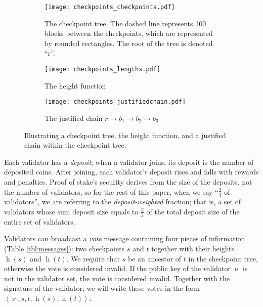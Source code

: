 \documentclass[12pt]{article}
\newcommand{\h}{\operatorname{h}\xspace}
\begin{document}
\begin{figure}[htb]
\centering
   \begin{subfigure}[b]{0.90\textwidth}
   \centering
   \texttt{[image: checkpoints\_checkpoints.pdf]}
	\caption{The checkpoint tree.  The dashed line represents 100 blocks between the checkpoints, which are represented by rounded rectangles.  The root of the tree is denoted ``r''.}
	\label{fig:2a}	
	\end{subfigure}
	\vspace{0.2in}
	
\begin{subfigure}[b]{0.45\textwidth}
   \centering
   \texttt{[image: checkpoints\_lengths.pdf]}
	\caption{The height function}
	\label{fig:2b}	
	\end{subfigure} \hspace{0.05\textwidth} 	 \begin{subfigure}[b]{0.45\textwidth}
   \centering
   \texttt{[image: checkpoints\_justifiedchain.pdf]}
	\caption{The justified chain $r \to b_1 \to b_2 \to b_3$}
	\label{fig:2c}	
	\end{subfigure}

\caption{Illustrating a checkpoint tree, the height function, and a justified chain within the checkpoint tree.}
\label{fig:conflicting_checkpoints}
\end{figure}



Each validator has a \emph{deposit}; when a validator joins, its deposit is the number of deposited coins.  After joining, each validator's deposit rises and falls with rewards and penalties.  Proof of stake's security derives from the size of the deposits, not the number of validators, so for the rest of this paper, when we say ``$\frac{2}{3}$ of validators'', we are referring to the \emph{deposit-weighted} fraction; that is, a set of validators whose sum deposit size equals to $\frac{2}{3}$ of the total deposit size of the entire set of validators.

Validators can broadcast a \textit{vote} message containing four pieces of information (Table \ref{tbl:messages}): two checkpoints $s$ and $t$ together with their heights $\h(s)$ and $\h(t)$.  We require that $s$ be an ancestor of $t$ in the checkpoint tree, otherwise the vote is considered invalid.  If the public key of the validator $\upnu$ is not in the validator set, the vote is considered invalid.  Together with the signature of the validator, we will write these votes in the form $\left\langle \upnu, s, t, \h(s), \h(t) \right\rangle$.
\end{document}
